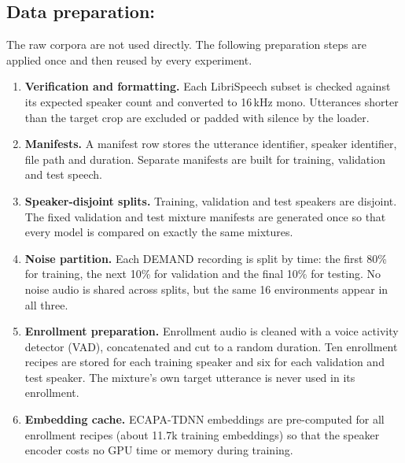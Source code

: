 \documentclass[11pt,a4paper]{article}
\begin{document}
\subsection{Data preparation:}
\label{sec:prep}
The raw corpora are not used directly. The following preparation steps are applied once and then
reused by every experiment.
\begin{enumerate}
  \item \textbf{Verification and formatting.} Each LibriSpeech subset is checked against its
        expected speaker count and converted to 16\,kHz mono. Utterances shorter than the target
        crop are excluded or padded with silence by the loader.
  \item \textbf{Manifests.} A manifest row stores the utterance identifier, speaker identifier,
        file path and duration. Separate manifests are built for training, validation and test
        speech.
  \item \textbf{Speaker-disjoint splits.} Training, validation and test speakers are disjoint.
        The fixed validation and test mixture manifests are generated once so that every model
        is compared on exactly the same mixtures.
  \item \textbf{Noise partition.} Each DEMAND recording is split by time: the first 80\% for
        training, the next 10\% for validation and the final 10\% for testing. No noise audio is
        shared across splits, but the same 16 environments appear in all three.
  \item \textbf{Enrollment preparation.} Enrollment audio is cleaned with a voice activity
        detector (VAD), concatenated and cut to a random duration. Ten enrollment recipes are
        stored for each training speaker and six for each validation and test speaker. The
        mixture's own target utterance is never used in its enrollment.
  \item \textbf{Embedding cache.} ECAPA-TDNN embeddings are pre-computed for all enrollment
        recipes (about 11.7k training embeddings) so that the speaker encoder costs no GPU time or
        memory during training.
\end{enumerate}
\end{document}
